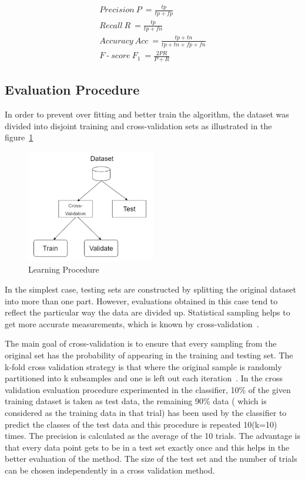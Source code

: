 \documentclass[letterpaper,10pt]{article}
\DeclareMathOperator{\dash}{-}
\theoremstyle{mytheor}
\begin{document}
\begin{gather}
Precision\ P\ = \frac{tp}{tp + fp} \\ 
Recall\ R\ = \frac{tp}{tp + fn} \\
Accuracy\ Acc\ = \frac{tp + tn}{tp + tn + fp + fn} \\
F \dash score\ F_{1}\ = \frac{2PR}{P+R}
\end{gather}

\subsection{Evaluation Procedure}

In order to prevent over fitting and better train the algorithm, the dataset was divided into disjoint training and cross-validation sets as illustrated in the figure~\ref{fig:5}

\begin{figure}[H]
\includegraphics[width=0.5\textwidth]{procedure}
\centering
\caption{Learning Procedure}
\label{fig:5}
\end{figure}

In the simplest case, testing sets are constructed by splitting the original dataset into more than one part. However, evaluations obtained in this case tend to reflect the particular way the data are divided up. Statistical sampling helps to get more accurate measurements, which is known by cross-validation~\cite{kohavi1995study}.

The main goal of cross-validation is to ensure that every sampling from the original set has the probability of appearing in the training and testing set. The k-fold cross validation strategy is that where the original sample is randomly partitioned into k subsamples and one is left out each iteration~\cite{kohavi1995study}. In the cross validation evaluation procedure experimented in the classifier, 10\% of the given training dataset is taken as test data, the remaining 90\% data ( which is considered as the training data in that trial) has been used by the classifier to predict the classes of the test data and this procedure is repeated 10(k=10) times. The precision is calculated as the average of the 10 trials. The advantage is that every data point gets to be in a test set exactly once and this helps in the better evaluation of the method. The size of the test set and the number of trials can be chosen independently in a cross validation method.
\end{document}
